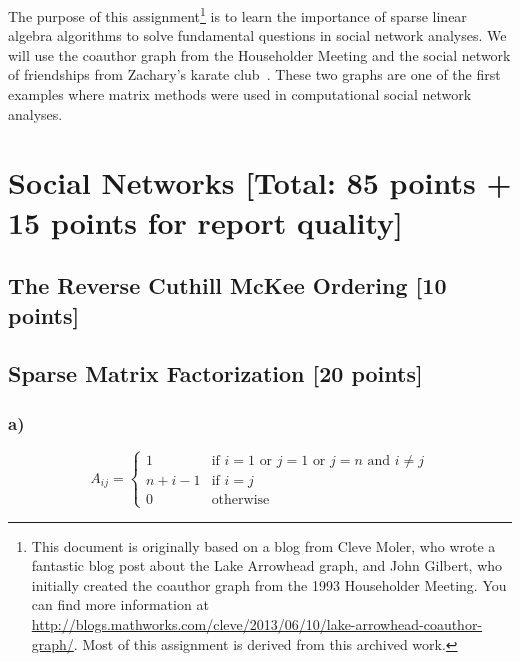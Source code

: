 \documentclass[unicode,11pt,a4paper,oneside,numbers=endperiod,openany]{scrartcl}
\begin{document}
\setassignment
{}

\newline

\assignmentpolicy


The purpose of this assignment\footnote{This document is originally 
based on a blog from Cleve Moler, who wrote a fantastic blog post about the Lake Arrowhead graph, and John 
Gilbert, who initially created the coauthor graph from the 1993 Householder Meeting. You can find more information 
at \url{http://blogs.mathworks.com/cleve/2013/06/10/lake-arrowhead-coauthor-graph/}.  Most of this assignment is derived
from this archived work.} is to learn the importance of sparse linear algebra algorithms to solve fundamental 
questions in social network analyses.
We will use the coauthor graph from the Householder Meeting and the social network of friendships from Zachary's karate club~\cite{karate}.
These two graphs are one of the first examples where matrix methods were used in computational social network analyses.

\section*{Social Networks [Total: 85 points + 15 points for report quality]}

\subsection{The Reverse Cuthill McKee Ordering [10 points]}

\subsection{Sparse Matrix Factorization [20 points]}

\subsubsection*{a)}

\[
    A_{ij} = 
    \begin{cases}
        1 & \text{if $i=1$ or $j=1$  or $j=n$ and $i \neq j$} \\
        n + i -1 & \text{if $i=j$}\\
        0 & \text{otherwise}
    \end{cases}
\]
\end{document}
